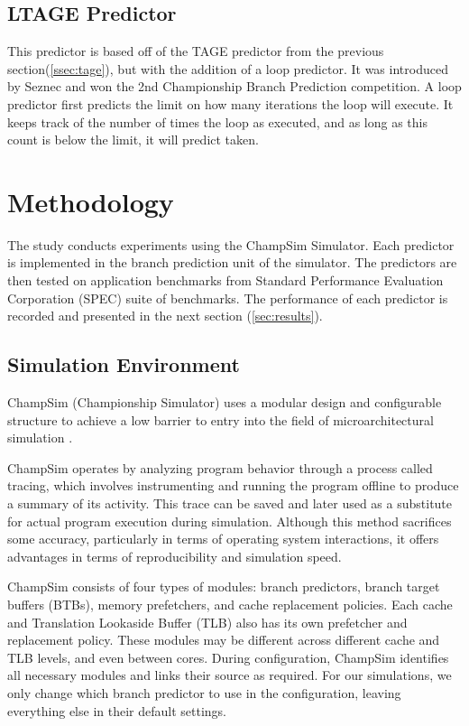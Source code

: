 \documentclass[conference]{IEEEtran}
\begin{document}
\subsection{LTAGE Predictor} \label{ssec:ltage}
This predictor is based off of the TAGE predictor from the previous section(\ref{ssec:tage}), but with the addition of a loop predictor. It was introduced by Seznec and won the 2nd Championship Branch Prediction competition\cite{seznec2004}. A loop predictor first predicts the limit on how many iterations the loop will execute. It keeps track of the number of times the loop as executed, and as long as this count is below the limit, it will predict taken. 

\section{Methodology} \label{sec:methodology}
The study conducts experiments using the ChampSim Simulator. Each predictor is implemented in the branch prediction unit of the simulator. The predictors are then tested on application benchmarks from Standard Performance Evaluation Corporation (SPEC) suite of benchmarks. The performance of each predictor is recorded and presented in the next section (\ref{sec:results}).

\subsection{Simulation Environment} \label{ssec:champsim}
ChampSim (Championship Simulator) uses a modular design and configurable structure to achieve a low barrier to entry into the field of microarchitectural simulation \cite{gober2022championship}.

ChampSim operates by analyzing program behavior through a process called tracing, which involves instrumenting and running the program offline to produce a summary of its activity. This trace can be saved and later used as a substitute for actual program execution during simulation. Although this method sacrifices some accuracy, particularly in terms of operating system interactions, it offers advantages in terms of reproducibility and simulation speed.

ChampSim consists of four types of modules: branch predictors, branch target buffers (BTBs), memory prefetchers, and cache replacement policies. Each cache and Translation Lookaside Buffer (TLB) also has its own prefetcher and replacement policy. These modules may be different across different cache and TLB levels, and even between cores. During configuration, ChampSim identifies all necessary modules and links their source as required. For our simulations, we only change which branch predictor to use in the configuration, leaving everything else in their default settings.
\end{document}

